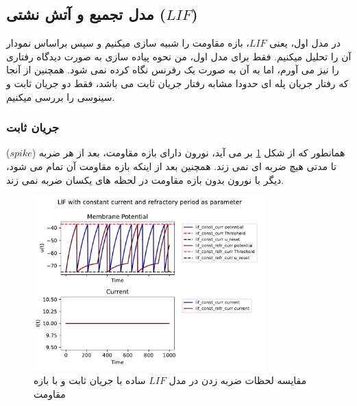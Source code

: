 \documentclass{article}
\begin{document}
        \subsection{مدل تجمیع و آتش نشتی ($LIF$)}
            در مدل اول، یعنی 
            $LIF$، 
            بازه مقاومت را شبیه سازی میکنیم و سپس براساس نمودار آن را تحلیل میکنیم. فقط برای مدل اول، من نحوه پیاده سازی  به صورت دیدگاه رفتاری را نیز می آورم، اما به آن به صورت یک رفرنس نگاه کرده نمی شود. همچنین از آنجا که رفتار جریان پله ای حدودا مشابه رفتار جریان ثابت می باشد، فقط دو جریان ثابت و سینوسی را بررسی میکنیم.
            \subsubsection{جریان ثابت}
                همانطور که از شکل 
                \ref{fig:lif-const-curr-refractory}
                بر می آید، نورون دارای بازه مقاومت، بعد از هر ضربه
                ($spike$) 
                تا مدتی هیچ ضربه ای نمی زند. همچنین بعد از اینکه بازه مقاومت آن تمام می شود، دیگر با نورون بدون بازه مقاومت در لحظه های یکسان ضربه نمی زند.
                \begin{figure}[H]
                    \centering
                    \includegraphics[width=0.8\textwidth]{plots/LIF with constant current and refractory period as parameter.pdf} 
                    \caption{مقایسه لحظات ضربه زدن در مدل $LIF$ ساده با جریان ثابت و با بازه مقاومت}
                    \label{fig:lif-const-curr-refractory}
                \end{figure}
\end{document}
